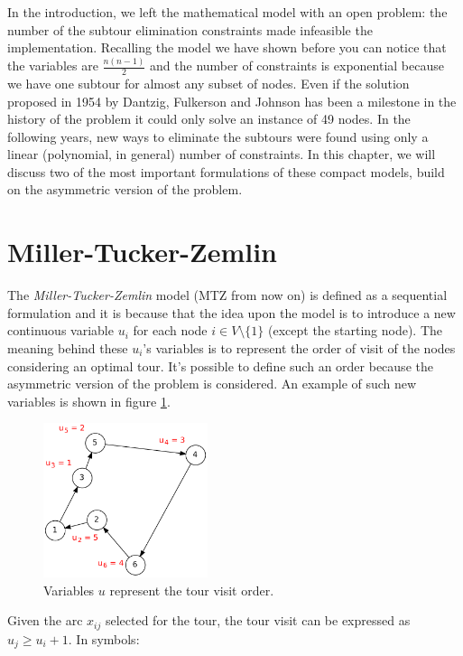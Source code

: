 In the introduction, we left the mathematical model with an open problem: the
number of the subtour elimination constraints made infeasible the
implementation. Recalling the model we have shown before you can notice that
the variables are $\frac{n(n-1)}{2}$ and the number of constraints is
exponential because we have one subtour for almost any subset of nodes. Even if
the solution proposed in 1954 by Dantzig, Fulkerson and Johnson has been a
milestone in the history of the problem it could only solve an instance of 49
nodes. In the following years, new ways to eliminate the subtours were found
using only a linear (polynomial, in general) number of constraints. In this
chapter, we will discuss two of the most important formulations of these
compact models, build on the asymmetric version of the problem.

\section{Miller-Tucker-Zemlin}
The \emph{Miller-Tucker-Zemlin} model
\citep{miller1960integer}\citep{sawik2016note} (MTZ from now on) is defined as a
sequential formulation and it is because that the idea upon the model is to
introduce a new continuous variable $u_i$ for each node $i \in V \setminus
\{1\}$ (except the starting node). The meaning behind these $u_i$'s variables is
to represent the order of visit of the nodes considering an optimal tour. It's
possible to define such an order because the asymmetric version of the problem
is considered. An example of such new variables is shown in figure
\ref{fig:MTZ_example}.

\begin{figure}
    \centering
    \includegraphics[width=0.43\textwidth]{figures/mtz}
    \caption{Variables $u$ represent the tour visit order.}
    \label{fig:MTZ_example}
\end{figure}

Given the arc $x_{ij}$ selected for the tour, the tour visit can be expressed
as $u_j \geq u_i + 1$. In symbols:



